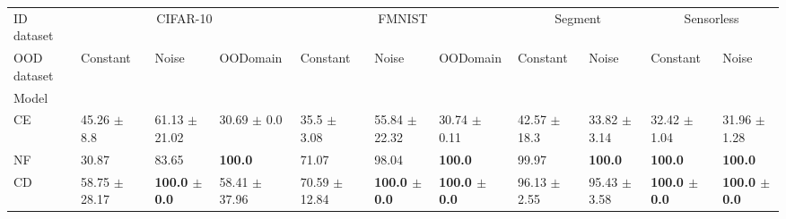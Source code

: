 \begin{tabular}{lllllllllll}
\toprule
ID dataset & \multicolumn{3}{c}{CIFAR-10} & \multicolumn{3}{c}{FMNIST} & \multicolumn{2}{c}{Segment} & \multicolumn{2}{c}{Sensorless} \\
\cmidrule(l){2-4} \cmidrule(l){5-7} \cmidrule(l){8-9} \cmidrule(l){10-11} 
OOD dataset &                                     Constant &                                       Noise &                                    OODomain &                                     Constant &                                       Noise &                                    OODomain &                                    Constant &                                       Noise &                                    Constant &                                        Noise \\
Model  &                                              &                                             &                                             &                                              &                                             &                                             &                                             &                                             &                                             &                                              \\
\midrule
CE     &              45.26 {\footnotesize $\pm$ 8.8} &           61.13 {\footnotesize $\pm$ 21.02} &             30.69 {\footnotesize $\pm$ 0.0} &              35.5 {\footnotesize $\pm$ 3.08} &           55.84 {\footnotesize $\pm$ 22.32} &            30.74 {\footnotesize $\pm$ 0.11} &            42.57 {\footnotesize $\pm$ 18.3} &            33.82 {\footnotesize $\pm$ 3.14} &            32.42 {\footnotesize $\pm$ 1.04} &             31.96 {\footnotesize $\pm$ 1.28} \\
NF     &                                       30.87  &            83.65  &                                          \bfseries{100.0} &                                       71.07  &            98.04  &                                          \bfseries{100.0} &                                      99.97  &  \bfseries{100.0} &                           \bfseries{100.0 } &   \bfseries{100.0} \\
\midrule
CD   &            58.75 {\footnotesize $\pm$ 28.17} &  \bfseries{100.0 {\footnotesize $\pm$ 0.0}} &           58.41 {\footnotesize $\pm$ 37.96} &            70.59 {\footnotesize $\pm$ 12.84} &  \bfseries{100.0 {\footnotesize $\pm$ 0.0}} &  \bfseries{100.0 {\footnotesize $\pm$ 0.0}} &            96.13 {\footnotesize $\pm$ 2.55} &            95.43 {\footnotesize $\pm$ 3.58} &  \bfseries{100.0 {\footnotesize $\pm$ 0.0}} &   \bfseries{100.0 {\footnotesize $\pm$ 0.0}} \\

\end{tabular}

